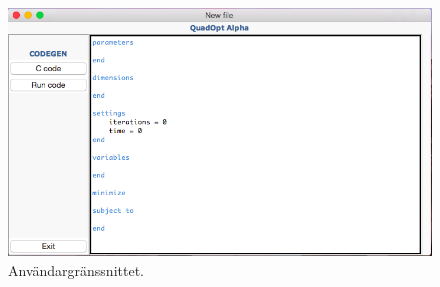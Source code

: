 \begin{figure}[h!]
	\begin{center}
		\includegraphics[scale=0.5]{bilder/macgui.png}
	\end{center}
	\caption{Användargränssnittet.}
\end{figure}

